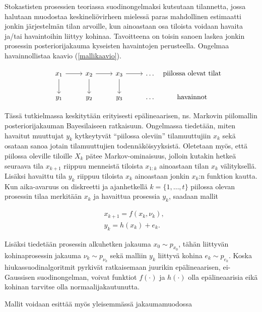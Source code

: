 \documentclass[
  12pt,
  a4paper, twoside]{book}
\begin{document}
Stokastisten prosessien teoriassa suodinongelmaksi kutsutaan tilannetta, jossa halutaan muodostaa keskineliövirheen mielessä paras mahdollinen estimaatti jonkin järjestelmän tilan arvoille, kun ainoastaan osa tiloista voidaan havaita ja/tai havaintoihin liittyy kohinaa. Tavoitteena on toisin sanoen laskea jonkin prosessin posteriorijakauma kyseisten havaintojen perusteella. Ongelmaa havainnollistaa kaavio (\ref{mallikaavio}).

\begin{equation}\label{mallikaavio}
\begin{tikzcd}
x_1 \arrow[d] \arrow[r] & x_2 \arrow[d] \arrow[r] & x_3 \arrow[d] \arrow[r] & \ldots & \makebox[\widthof{$ \text{havainnot}$}]{$\text{piilossa olevat tilat}$} \\
y_1  & y_2  & y_3  & \ldots & \makebox[\widthof{$ \text{havainnot}$}]{$\text{havainnot}$}
\end{tikzcd}
\end{equation}

Tässä tutkielmassa keskitytään erityisesti epälineaarisen, ns. Markovin piilomallin posteriorijakauman Bayesilaiseen ratkaisuun. Ongelmassa tiedetään, miten havaitut muuttujat \(y_k\) kytkeytyvät ``piilossa oleviin'' tilamuuttujiin \(x_k\) sekä osataan sanoa jotain tilamuuttujien todennäköisyyksistä. Oletetaan myös, että piilossa oleville tiloille \(X_k\) pätee Markov-ominaisuus, jolloin kutakin hetkeä seuraava tila \(x_{k+1}\) riippuu menneistä tiloista \(x_{1:k}\) ainoastaan tilan \(x_k\) välityksellä. Lisäksi havaittu tila \(y_k\) riippuu tiloista \(x_{k}\) ainoastaan jonkin \(x_k\):n funktion kautta. Kun aika-avaruus on diskreetti ja ajanhetkellä \(k=\{1,\ldots,t\}\) piilossa olevan prosessin tilaa merkitään \(x_k\) ja havaittua prosessia \(y_k\), saadaan mallit

\begin{align}
&\label{malli-1} x_{k+1} = f(x_k, \nu_k),\\
&\label{malli-2} y_{k} = h(x_k)+e_k.
\end{align}

Lisäksi tiedetään prosessin alkuhetken jakauma \(x_0 \sim p_{x_{0}}\), tähän liittyvän kohinaprosessin jakauma \(\nu_k \sim p_{\nu_{k}}\) sekä malliin \(y_k\) liittyvä kohina \(e_k \sim p_{e_k}\). Koska hiukassuodinalgoritmit pyrkivät ratkaisemaan juurikin epälineaarisen, ei-Gaussisen suodinongelman, voivat funktiot \(f(\cdot)\) ja \(h(\cdot)\) olla epälineaarisia eikä kohinan tarvitse olla normaalijakautunutta.

Mallit voidaan esittää myös yleisemmässä jakaumamuodossa
\end{document}
